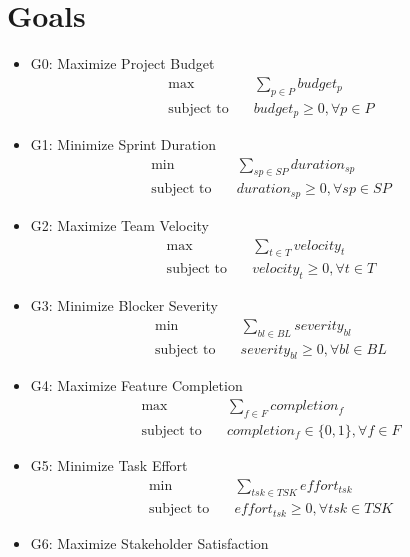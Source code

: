 \documentclass{article}
\begin{document}
\section{Goals}
\begin{itemize}
    \item G0: Maximize Project Budget
        \begin{align*}
            \max \quad &\sum_{p \in P} budget_p \\
            \text{subject to} \quad &budget_p \geq 0, \forall p \in P
        \end{align*}
    \item G1: Minimize Sprint Duration
        \begin{align*}
            \min \quad &\sum_{sp \in SP} duration_{sp} \\
            \text{subject to} \quad &duration_{sp} \geq 0, \forall sp \in SP
        \end{align*}
    \item G2: Maximize Team Velocity
        \begin{align*}
            \max \quad &\sum_{t \in T} velocity_t \\
            \text{subject to} \quad &velocity_t \geq 0, \forall t \in T
        \end{align*}
    \item G3: Minimize Blocker Severity
        \begin{align*}
            \min \quad &\sum_{bl \in BL} severity_{bl} \\
            \text{subject to} \quad &severity_{bl} \geq 0, \forall bl \in BL
        \end{align*}
    \item G4: Maximize Feature Completion
        \begin{align*}
            \max \quad &\sum_{f \in F} completion_f \\
            \text{subject to} \quad &completion_f \in \{0,1\}, \forall f \in F
        \end{align*}
    \item G5: Minimize Task Effort
        \begin{align*}
            \min \quad &\sum_{tsk \in TSK} effort_{tsk} \\
            \text{subject to} \quad &effort_{tsk} \geq 0, \forall tsk \in TSK
        \end{align*}
    \item G6: Maximize Stakeholder Satisfaction
        \begin{align*}

\end{align*}
\end{itemize}
\end{document}
